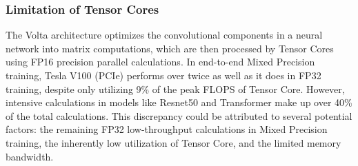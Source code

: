 \subsubsection{Limitation of Tensor Cores}
The Volta architecture optimizes the convolutional components in a neural network into matrix computations, which are then processed by Tensor Cores using FP16 precision parallel calculations.
In end-to-end Mixed Precision training, Tesla V100 (PCIe) performs over twice as well as it does in FP32 training, despite only utilizing 9\% of the peak FLOPS of Tensor Core.
However, intensive calculations in models like Resnet50 and Transformer make up over 40\% of the total calculations.
This discrepancy could be attributed to several potential factors: the remaining FP32 low-throughput calculations in Mixed Precision training, the inherently low utilization of Tensor Core, and the limited memory bandwidth.